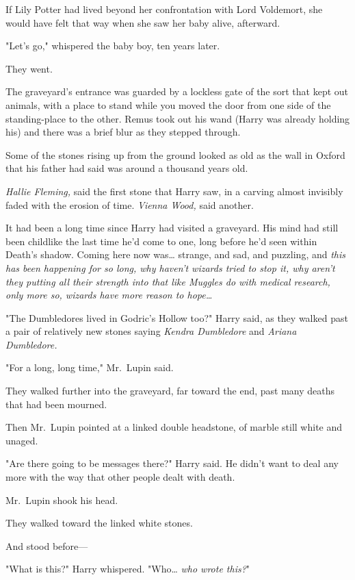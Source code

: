If Lily Potter had lived beyond her confrontation with Lord Voldemort, she 
would have felt that way when she saw her baby alive, afterward.

"Let's go," whispered the baby boy, ten years later.

They went.

The graveyard's entrance was guarded by a lockless gate of the sort that kept 
out animals, with a place to stand while you moved the door from one side of 
the standing-place to the other. Remus took out his wand (Harry was already 
holding his) and there was a brief blur as they stepped through.

Some of the stones rising up from the ground looked as old as the wall in 
Oxford that his father had said was around a thousand years old.

\emph{Hallie Fleming,} said the first stone that Harry saw, in a carving almost 
invisibly faded with the erosion of time. \emph{Vienna Wood,} said another.

It had been a long time since Harry had visited a graveyard. His mind had still 
been childlike the last time he'd come to one, long before he'd seen within 
Death's shadow. Coming here now was{\ldots} strange, and sad, and puzzling, and 
\emph{this has been happening for so long, why haven't wizards tried to stop 
it, why aren't they putting all their strength into that like Muggles do with 
medical research, only more so, wizards have more reason to hope{\ldots}}

"The Dumbledores lived in Godric's Hollow too?" Harry said, as they walked past 
a pair of relatively new stones saying \emph{Kendra Dumbledore} and 
\emph{Ariana Dumbledore.}

"For a long, long time," Mr.~Lupin said.

They walked further into the graveyard, far toward the end, past many deaths 
that had been mourned.

Then Mr.~Lupin pointed at a linked double headstone, of marble still white and 
unaged.

"Are there going to be messages there?" Harry said. He didn't want to deal any 
more with the way that other people dealt with death.

Mr.~Lupin shook his head.

They walked toward the linked white stones.

And stood before---

"What is this?" Harry whispered. "Who{\ldots} \emph{who wrote this?}"

